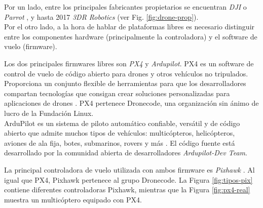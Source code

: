 \documentclass[../main.tex]{subfiles}
\begin{document}
\begin{figure}[ht]
\end{figure}

Por un lado, entre los principales fabricantes propietarios se encuentran \emph{DJI} \cite{dji} o \emph{Parrot} \cite{parrot}, y hasta 2017 \emph{3DR Robotics} \cite{3dr} (ver Fig. \ref{fig:drone-prop}). \\
Por el otro lado, a la hora de hablar de plataformas libres es necesario distinguir entre los componentes hardware (principalmente la controladora) y el software de vuelo (firmware).

Los dos principales firmwares libres son \emph{PX4} y \emph{Ardupilot}.
PX4 es un software de control de vuelo de código abierto para drones y otros vehículos no tripulados. Proporciona un conjunto flexible de herramientas para que los desarrolladores compartan tecnologías que consigan crear soluciones personalizadas para aplicaciones de drones \cite{meier2015px4}. PX4 pertenece Dronecode, una organización sin ánimo de lucro de la Fundación Linux. \\
ArduPilot es un sistema de piloto automático confiable, versátil y de código abierto que admite muchos tipos de vehículos: multicópteros, helicópteros, aviones de ala fija, botes, submarinos, rovers y más \cite{ardupilot}. El código fuente está desarrollado por la comunidad abierta de desarrolladores \emph{Ardupilot-Dev Team}.

La principal controladora de vuelo utilizada con ambos firmware es \emph{Pixhawk} \cite{meier2011pixhawk}. Al igual que PX4, Pixhawk pertenece al grupo Dronecode.
La Figura \ref{fig:tipos-pix} contiene diferentes controladoras Pixhawk, mientras que la Figura \ref{fig:px4-real} muestra un multicóptero equipado con PX4.

\end{document}
